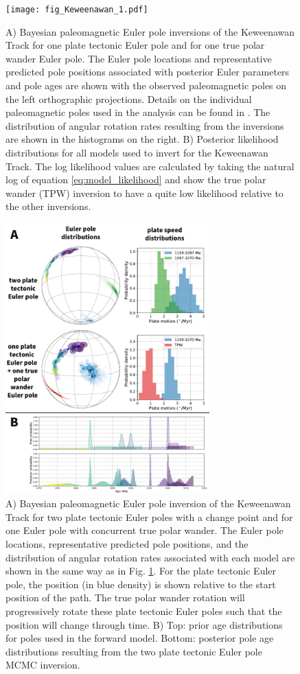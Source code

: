 \documentclass[11pt,letterpaper]{article}
\begin{document}
\begin{figure}
\centering
\texttt{[image: fig\_Keweenawan\_1.pdf]}
\caption{A) Bayesian paleomagnetic Euler pole inversions of the Keweenawan Track for one plate tectonic Euler pole and for one true polar wander Euler pole. The Euler pole locations and representative predicted pole positions associated with posterior Euler parameters and pole ages are shown with the observed paleomagnetic poles on the left orthographic projections. Details on the individual paleomagnetic poles used in the analysis can be found in \cite{Swanson-Hysell2019a}. The distribution of angular rotation rates resulting from the inversions are shown in the histograms on the right. B) Posterior likelihood distributions for all models used to invert for the Keweenawan Track. The log likelihood values are calculated by taking the natural log of equation \ref{eq:model_likelihood} and show the true polar wander (TPW) inversion to have a quite low likelihood relative to the other inversions.}
\label{fig:Keweenawan_Track_1}
\end{figure}

\begin{figure}
\centering
\includegraphics[width=0.7\textwidth]{fig_Keweenawan_2.pdf}
\caption{A) Bayesian paleomagnetic Euler pole inversion of the Keweenawan Track for two plate tectonic Euler poles with a change point and for one Euler pole with concurrent true polar wander. The Euler pole locations, representative predicted pole positions, and the distribution of angular rotation rates associated with each model are shown in the same way as in Fig. \ref{fig:Keweenawan_Track_1}. For the plate tectonic Euler pole, the position (in blue density) is shown relative to the start position of the path. The true polar wander rotation will progressively rotate these plate tectonic Euler poles such that the position will change through time.  B) Top: prior age distributions for poles used in the forward model. Bottom: posterior pole age distributions resulting from the two plate tectonic Euler pole MCMC inversion.}
\label{fig:Keweenawan_Track_2}
\end{figure}
\end{document}

